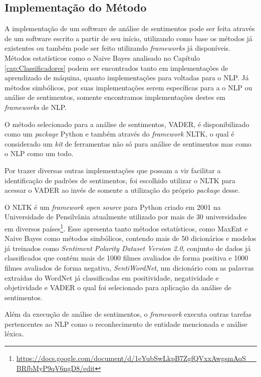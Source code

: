 \subsection{Implementação do Método}

A implementação de um software de análise de sentimentos pode ser feita através
de um software escrito a partir de seu início, utilizando como base os métodos
já existentes ou também pode ser feito utilizando \textit{frameworks} já
disponíveis. Métodos estatísticos como o Naive Bayes analisado no Capítulo
\ref{cap:Classificadores} podem ser encontrados tanto em implementações de
aprendizado de máquina, quanto implementações para voltadas para o \ac{NLP}.
Já métodos simbólicos, por suas implementações serem específicas para a o
\ac{NLP} ou análise de sentimentos, somente encontramos implementações destes em
\textit{frameworks} de \ac{NLP}.

O método selecionado para a análise de sentimentos, \ac{VADER}, é
disponibilizado como um \textit{package} Python e também através do
\textit{framework} \ac{NLTK}, o qual é considerado um \textit{kit} de
ferramentas não só para análise de sentimentos mas como o \ac{NLP} como um todo.

Por trazer diversas outras implementações que possam a vir facilitar a
identificação de padrões de sentimentos, foi escolhido utilizar o \ac{NLTK} para
acessar o \ac{VADER} ao invés de somente a utilização do próprio
\textit{package} desse.

O \ac{NLTK} é um \textit{framework open source} para Python
criado em 2001 na Universidade de Pensilvânia atualmente utilizado por mais de
30 universidades em diversos
países\footnote{\url{https://docs.google.com/document/d/1eYubSwLkpB7ZgfQVxxAwgsmAqS__BRfbMyP9qV6ngD8/edit}}.
Esse apresenta tanto métodos estatísticos, como \ac{MaxEnt} e Naive Bayes como métodos simbólicos, contendo
mais de 50 dicionários e modelos já treinados como \textit{Sentiment Polarity Dataset Version 2.0}, conjunto de dados já classificados que contém mais de 1000 filmes avaliados de forma positiva e 1000 filmes avaliados de forma negativa, \textit{SentiWordNet},
um dicionário com as palavras extraídas do WordNet já classificadas em
positividade, negatividade e objetividade e \ac{VADER} o qual foi selecionado
para aplicação da análise de sentimentos.

Além da execução de análise de sentimentos, o \textit{framework} executa outras
tarefas pertencentes ao \ac{NLP} como o reconhecimento de entidade mencionada e
análise léxica.
